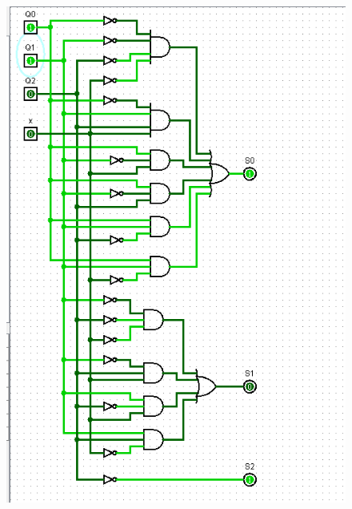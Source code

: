 \documentclass[]{article}
\begin{document}
\begin{minipage}{0.5\textwidth}
\begin{figure}[H]
	\centering
	\includegraphics[width=1\textwidth]{test0_6.png}
\end{figure}
\end{minipage}
\end{document}
